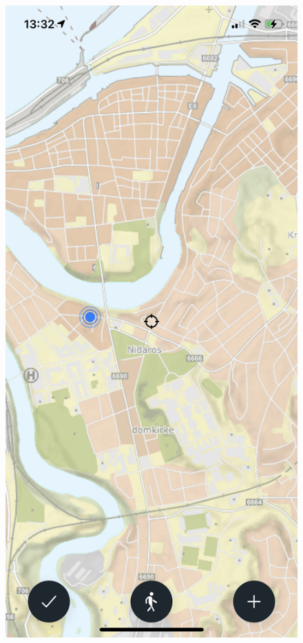\begin{figure}[H]
  \centering
  \begin{minipage}[b]{0.4\textwidth}
    \centering
    \includegraphics[scale=0.4]{Figurer/skjermbilder/kart-plain.png}

\end{minipage}
\end{figure}

